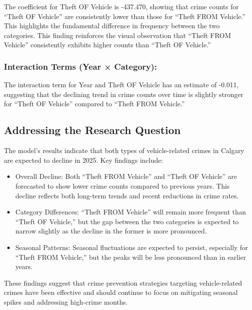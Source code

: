 \documentclass[
  letterpaper,
  DIV=11,
  numbers=noendperiod]{scrartcl}
\begin{document}
The coefficient for Theft OF Vehicle is -437.470, showing that crime
counts for ``Theft OF Vehicle'' are consistently lower than those for
``Theft FROM Vehicle.'' This highlights the fundamental difference in
frequency between the two categories. This finding reinforces the visual
observation that ``Theft FROM Vehicle'' consistently exhibits higher
counts than ``Theft OF Vehicle.''

\subsubsection{Interaction Terms (Year ×
Category):}\label{interaction-terms-year-category}

The interaction term for Year and Theft OF Vehicle has an estimate of
-0.011, suggesting that the declining trend in crime counts over time is
slightly stronger for ``Theft OF Vehicle'' compared to ``Theft FROM
Vehicle.''

\subsection{Addressing the Research
Question}\label{addressing-the-research-question}

The model's results indicate that both types of vehicle-related crimes
in Calgary are expected to decline in 2025. Key findings include:

\begin{itemize}
\item
  Overall Decline: Both ``Theft FROM Vehicle'' and ``Theft OF Vehicle''
  are forecasted to show lower crime counts compared to previous years.
  This decline reflects both long-term trends and recent reductions in
  crime rates.
\item
  Category Differences: ``Theft FROM Vehicle'' will remain more frequent
  than ``Theft OF Vehicle,'' but the gap between the two categories is
  expected to narrow slightly as the decline in the former is more
  pronounced.
\item
  Seasonal Patterns: Seasonal fluctuations are expected to persist,
  especially for ``Theft FROM Vehicle,'' but the peaks will be less
  pronounced than in earlier years.
\end{itemize}

These findings suggest that crime prevention strategies targeting
vehicle-related crimes have been effective and should continue to focus
on mitigating seasonal spikes and addressing high-crime months.
\end{document}
